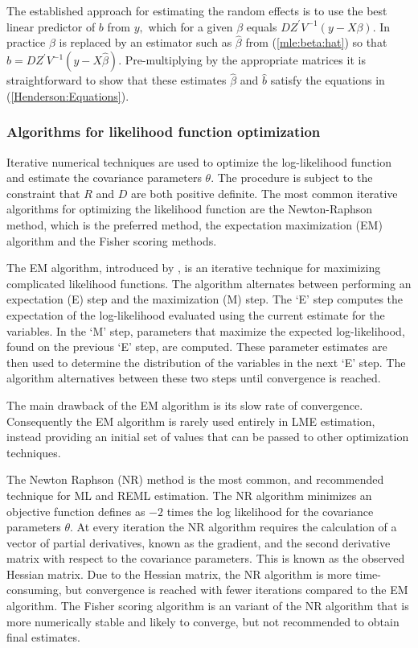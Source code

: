 \documentclass[12pt, a4paper]{report}
\theoremstyle{plain}
\theoremstyle{definition}
\theoremstyle{remark}
\begin{document}
The established approach for estimating the random effects is to use the best linear predictor of $b$ from $y,$ which for a given $\beta$ equals $DZ^\prime V^{-1}(y - X \beta).$ In practice $\beta$ is replaced by an estimator such as $\hat{\beta}$ from (\ref{mle:beta:hat}) so that $\hat{b} = DZ^\prime V^{-1}(y - X \hat{\beta}).$ Pre-multiplying by the appropriate matrices it is straightforward to show that these estimates $\hat{\beta}$ and $\hat{b}$ satisfy the equations in (\ref{Henderson:Equations}).

\subsubsection{Algorithms for likelihood function optimization}Iterative numerical techniques are used to optimize the log-likelihood function and estimate the covariance parameters $\theta$. The procedure is subject to the constraint that $R$ and $D$ are both positive definite. The most common iterative algorithms for optimizing the likelihood function are the Newton-Raphson method, which is the preferred method, the expectation maximization (EM) algorithm and the Fisher scoring methods.

The EM algorithm, introduced by \citet{EM}, is an iterative technique for maximizing complicated likelihood functions. The algorithm alternates between performing an expectation (E) step
and the maximization (M) step. The `E' step computes the expectation of the log-likelihood evaluated using the current
estimate for the variables. In the `M' step, parameters that maximize the expected log-likelihood, found on the previous `E' step, are computed. These parameter estimates are then used to determine the distribution of the variables in the next `E' step. The algorithm alternatives between these two steps until convergence is reached.

The main drawback of the EM algorithm is its slow rate of
convergence. Consequently the EM algorithm is rarely used entirely in LME estimation,
instead providing an initial set of values that can be passed to
other optimization techniques.

The Newton Raphson (NR) method is the most common, and recommended technique for ML and
REML estimation. The NR algorithm minimizes an objective function defines as $-2$ times the log likelihood for the covariance parameters $\theta$. At every iteration the NR algorithm requires the
calculation of a vector of partial derivatives, known as the gradient, and the second derivative matrix with respect to the covariance parameters. This is known as the observed Hessian matrix. Due to the Hessian matrix, the NR algorithm is more time-consuming, but convergence is reached with fewer iterations compared to the EM algorithm. The Fisher scoring algorithm is an variant of the NR algorithm that is more numerically stable and likely to converge, but not recommended to obtain final estimates.
\end{document}
